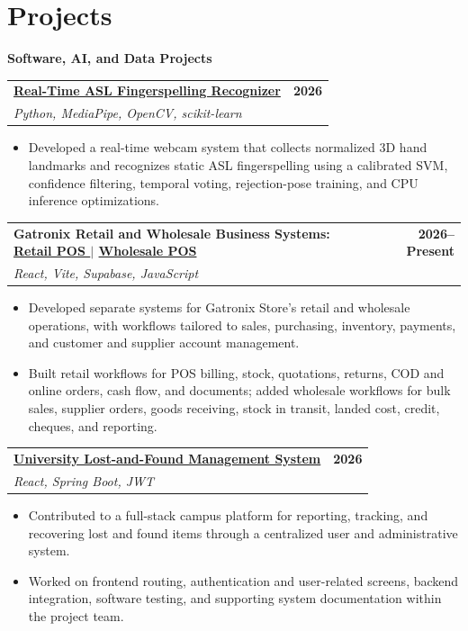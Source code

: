 \documentclass[a4paper,10pt]{article}
\makeatletter
\newcommand{\projectEntry}[3]{%
  \Needspace{9\baselineskip}%
  \begin{tabularx}{\textwidth}{@{}Xr@{}}
    \textbf{#1} & \textbf{\small #3} \\
    {\small\textit{#2}} &
  \end{tabularx}
  \vspace{0.35mm}
}
\newcommand{\projectCategory}[1]{%
  \vspace{1.0mm}
  {\normalsize\bfseries\color{accent} #1}\par
  \vspace{0.75mm}
}
\makeatother
\begin{document}
\section{Projects}

\projectCategory{Software, AI, and Data Projects}

\projectEntry
  {\href{https://github.com/hakammra/asl-fingerspelling-webcam}{Real-Time ASL Fingerspelling Recognizer \faGithub}}
  {Python, MediaPipe, OpenCV, scikit-learn}
  {2026}
\begin{itemize}
  \item Developed a real-time webcam system that collects normalized 3D hand landmarks and recognizes static ASL fingerspelling using a calibrated SVM, confidence filtering, temporal voting, rejection-pose training, and CPU inference optimizations.
\end{itemize}
\vspace{1.35mm}

\projectEntry
  {Gatronix Retail and Wholesale Business Systems:
  \href{https://github.com/hakammra/Shop-POS}{Retail POS \faGithub}
  \enspace $\vert$ \enspace
  \href{https://github.com/hakammra/gs-wholesale}{Wholesale POS \faGithub}}
  {React, Vite, Supabase, JavaScript}
  {2026--Present}
\begin{itemize}
  \item Developed separate systems for Gatronix Store's retail and wholesale operations, with workflows tailored to sales, purchasing, inventory, payments, and customer and supplier account management.
  \item Built retail workflows for POS billing, stock, quotations, returns, COD and online orders, cash flow, and documents; added wholesale workflows for bulk sales, supplier orders, goods receiving, stock in transit, landed cost, credit, cheques, and reporting.
\end{itemize}
\vspace{1.35mm}

\projectEntry
  {\href{https://github.com/AmiruMunasinghe/Lost-Found-System}{University Lost-and-Found Management System \faGithub}}
  {React, Spring Boot, JWT}
  {2026}
\begin{itemize}
  \item Contributed to a full-stack campus platform for reporting, tracking, and recovering lost and found items through a centralized user and administrative system.
  \item Worked on frontend routing, authentication and user-related screens, backend integration, software testing, and supporting system documentation within the project team.
\end{itemize}
\vspace{1.5mm}
\end{document}
